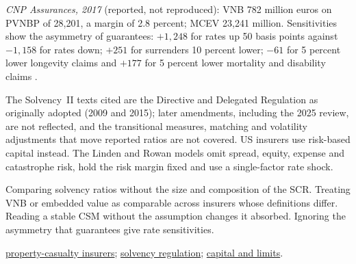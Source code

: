 \begin{qfmethod}
\emph{CNP Assurances, 2017} (reported, not reproduced): VNB 782 million euros on PVNBP of 28,201, a margin of 2.8 percent; MCEV 23,241 million. Sensitivities show the asymmetry of guarantees: $+1{,}248$ for rates up 50 basis points against $-1{,}158$ for rates down; $+251$ for surrenders 10 percent lower; $-61$ for 5 percent lower longevity claims and $+177$ for 5 percent lower mortality and disability claims \citep[pp.~12, 21--22]{cnp-mcev-2017}.

 The Solvency~II texts cited are the Directive and Delegated Regulation as originally adopted (2009 and 2015); later amendments, including the 2025 review, are not reflected, and the transitional measures, matching and volatility adjustments that move reported ratios are not covered. US insurers use risk-based capital instead. The Linden and Rowan models omit spread, equity, expense and catastrophe risk, hold the risk margin fixed and use a single-factor rate shock.

 Comparing solvency ratios without the size and composition of the SCR. Treating VNB or embedded value as comparable across insurers whose definitions differ. Reading a stable CSM without the assumption changes it absorbed. Ignoring the asymmetry that guarantees give rate sensitivities.

 \hyperref[meth:insurer-analysis]{property-casualty insurers}; \hyperref[def:financial-institution-features]{solvency regulation}; \hyperref[meth:market-risk-limits-capital]{capital and limits}.

\end{qfmethod}
